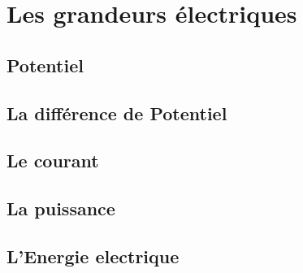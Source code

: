 \chapter{Les grandeurs électriques}



\section{Potentiel}

\section{La différence de Potentiel}

\section{Le courant}

\section{La puissance}

\section{L'Energie electrique}
